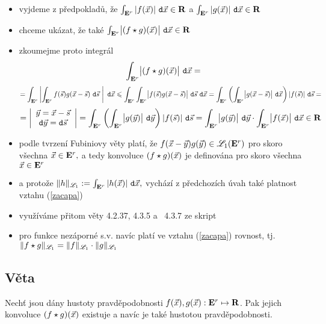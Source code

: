 \begin{itemize}
\item vyjdeme z p\v redpoklad\r u, \v ze $\int_{{{\mathbf E}^r}} |f({\vec{x}})|~\mathtt{d}{\vec{x}} \in{\mathbf R}$ a $\int_{{{\mathbf E}^r}} |g({\vec{x}})|~\mathtt{d}{\vec{x}} \in{\mathbf R}$

\item chceme uk\'azat, \v ze tak\'e $\int_{{{\mathbf E}^r}} \bigl|(f\star g)({\vec{x}})\bigr|~\mathtt{d}{\vec{x}} \in{\mathbf R}$

\item zkoumejme proto integr\'al $$\int_{{{\mathbf E}^r}} \bigl|(f\star g)({\vec{x}})\bigr|~\mathtt{d}{\vec{x}}=$$ $$=\int_{{{\mathbf E}^r}} \left|\int_{{{\mathbf E}^r}}f({\vec{s}})g({\vec{x}}-{\vec{s}})~\mathtt{d}{\vec{s}} ~\right|~\mathtt{d}{\vec{x}} \leqslant \int_{{{\mathbf E}^r}} \int_{{{\mathbf E}^r}} \bigl|f({\vec{s}})g({\vec{x}}-{\vec{s}})\bigr|~\mathtt{d}{\vec{s}}~\mathtt{d}{\vec{x}} =\int_{{{\mathbf E}^r}} \left(\int_{{{\mathbf E}^r}} \bigl|g({\vec{x}}-{\vec{s}})\bigr|~\mathtt{d}{\vec{x}}\right) |f({\vec{s}})|~\mathtt{d}{\vec{s}} =$$
%
$$=  \left|\begin{array}{c} {\vec{y}} = {\vec{x}} -{\vec{s}}\\ \mathtt{d}{\vec{y}}=\mathtt{d}{\vec{s}} \end{array}\right|= \int_{{{\mathbf E}^r}} \left(\int_{{{\mathbf E}^r}} \bigl|g({\vec{y}})\bigr|~\mathtt{d}{\vec{y}}\right) |f({\vec{s}})|~\mathtt{d}{\vec{s}}= \int_{{{\mathbf E}^r}} \bigl|g({\vec{y}})\bigr|~\mathtt{d}{\vec{y}} \cdot  \int_{{{\mathbf E}^r}} \bigl|f({\vec{x}})\bigr|~\mathtt{d}{\vec{x}} \in {\mathbf R}$$

\item podle tvrzen\' i Fubiniovy v\v ety plat\'i, \v ze $f({\vec{x}}-{\vec{y}})g({\vec{y}})\in{\mathscr L}_1({{\mathbf E}^r})$ pro skoro v\v sechna ${\vec{x}}\in{{\mathbf E}^r},$ a tedy konvoluce $(f\star g)({\vec{x}})$ je definov\'ana pro skoro v\v sechna ${\vec{x}}\in{{\mathbf E}^r}$
    
\item a proto\v ze $\|h\|_{{\mathscr L}_1}:= \int_{{{\mathbf E}^r}} |h({\vec{x}})|~\mathtt{d}{\vec{x}},$ vych\'az\' i z p\v redchoz\' ich \' uvah tak\'e platnost vztahu (\ref{zacapa})

\item vyu\v z\'iv\'ame p\v ritom v\v ety 4.2.37, 4.3.5 a \ 4.3.7 ze skript \cite{Krbalek_MAB4}

\item pro  funkce nez\'aporn\'e s.v. nav\' ic plat\' i ve vztahu  (\ref{zacapa}) rovnost, tj. $\|f\star g\|_{{\mathscr L}_1} = \|f\|_{{\mathscr L}_1} \cdot  \|g\|_{{\mathscr L}_1}$

\end{itemize}


\subsection{Věta}

Nechť jsou dány hustoty pravděpodobnosti $f({\vec{x}}),g({\vec{x}}):{{\mathbf E}^r}\mapsto{\mathbf R}$. Pak jejich konvoluce $(f\star g)({\vec{x}})$ existuje a nav\' ic je také hustotou pravděpodobnosti. 

\Proof

